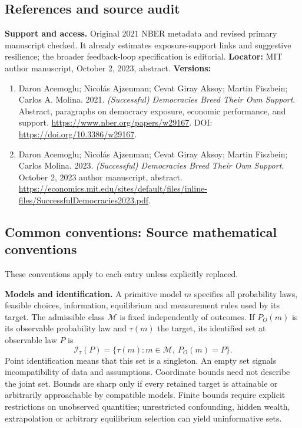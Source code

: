 \documentclass[11pt,a4paper]{article}
\begin{document}
\subsection*{References and source audit}
\textbf{Support and access.} Original 2021 NBER metadata and revised primary manuscript checked. It already estimates exposure-support links and suggestive resilience; the broader feedback-loop specification is editorial. \textbf{Locator:} MIT author manuscript, October 2, 2023, abstract. \textbf{Versions:}  
\begin{enumerate}\raggedright
\item\hypertarget{definitions:source:30007670:1}{} Daron Acemoglu; Nicolás Ajzenman; Cevat Giray Aksoy; Martin Fiszbein; Carlos A. Molina. 2021. \emph{(Successful) Democracies Breed Their Own Support}. Abstract, paragraphs on democracy exposure, economic performance, and support.
\url{https://www.nber.org/papers/w29167}.
DOI: \url{https://doi.org/10.3386/w29167}.
\item\hypertarget{definitions:source:30007670:2}{} Daron Acemoglu; Nicolás Ajzenman; Cevat Giray Aksoy; Martin Fiszbein; Carlos Molina. 2023. \emph{(Successful) Democracies Breed Their Own Support}. October 2, 2023 author manuscript, abstract.
\url{https://economics.mit.edu/sites/default/files/inline-files/SuccessfulDemocracies2023.pdf}.
\end{enumerate}

\subsection*{Common conventions: Source mathematical conventions}

These conventions apply to each entry unless explicitly replaced.

\textbf{Models and identification.} A primitive model \(m\) specifies all probability laws, feasible choices, information, equilibrium and measurement rules used by its target. The admissible class \(\mathcal M\) is fixed independently of outcomes. If \(P_O(m)\) is its observable probability law and \(\tau(m)\) the target, its identified set at observable law \(P\) is
\[
 \mathcal I_\tau(P)=\{\tau(m):m\in\mathcal M,\ P_O(m)=P\}.
\]
Point identification means that this set is a singleton. An empty set signals incompatibility of data and assumptions. Coordinate bounds need not describe the joint set. Bounds are sharp only if every retained target is attainable or arbitrarily approachable by compatible models. Finite bounds require explicit restrictions on unobserved quantities; unrestricted confounding, hidden wealth, extrapolation or arbitrary equilibrium selection can yield uninformative sets.
\end{document}
